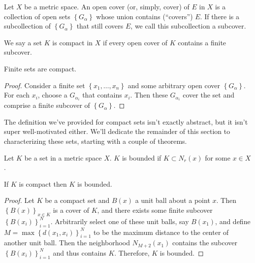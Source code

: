 \documentclass[../m131main.tex]{subfiles}
\begin{document}
\begin{definition}[Cover]
    Let $X$ be a metric space.
    An open cover (or, simply, cover) of $E$ in $X$ is a collection of open sets $\left\{ G_\alpha \right\}$ whose union contains (``covers'') $E$.
    If there is a subcollection of $\left\{ G_\alpha \right\}$ that still covers $E$, we call this subcollection a subcover.
\end{definition}

\begin{definition}
    We say a set $K$ is compact in $X$ if every open cover of $K$ contains a finite subcover.
\end{definition}

\begin{theorem}[]
    Finite sets are compact.
\end{theorem}

\begin{proof}
    Consider a finite set $\left\{ x_1, \ldots, x_n \right\}$ and some arbitrary open cover $\left\{ G_\alpha \right\}$.
    For each $x_i$, choose a $G_{\alpha_i}$ that contains $x_i$.
    Then these $G_{\alpha_i}$ cover the set and comprise a finite subcover of $\left\{ G_\alpha \right\}$.
\end{proof}

The definition we've provided for compact sets isn't exactly abstract, but it isn't super well-motivated either.
We'll dedicate the remainder of this section to characterizing these sets, starting with a couple of theorems.

\begin{definition}
    Let $K$ be a set in a metric space $X$.
    $K$ is bounded if $K \subset N_r(x)$ for some $x \in X$.
\end{definition}

\begin{theorem}
    If $K$ is compact then $K$ is bounded.
\end{theorem}

\begin{proof}
    Let $K$ be a compact set and $B(x)$ a unit ball about a point $x$.
    Then $\left\{ B(x) \right\}_{x \in K}$ is a cover of $K$, and there exists some finite subcover $\left\{ B(x_i) \right\}_{i=1}^N$.
    Arbitrarily select one of these unit balls, say $B(x_1)$, and define $M = \max \left\{ d(x_1, x_i) \right\}_{i=1}^N$ to be the maximum distance to the center of another unit ball.
    Then the neighborhood $N_{M+2}(x_1)$ contains the subcover $\left\{ B(x_i) \right\}_{i=1}^N$ and thus contains $K$.
    Therefore, $K$ is bounded.
\end{proof}
\end{document}
